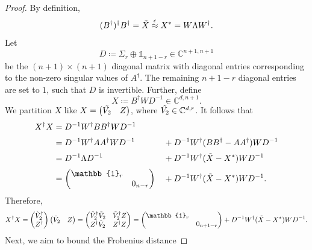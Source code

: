 \begin{proof}
By definition,
\begin{equation*}
(B^{\dag})^{\dag}B^{\dag}=\Tilde{X}\stackrel{\epsilon}{\approx}X^*=W\Lambda W^{\dag}.
\end{equation*}
Let 
\begin{equation*}
D\coloneqq\Sigma_r\oplus\mathbb{1}_{n+1-r}\in\mathbb{C}^{n+1,n+1}
\end{equation*} be the $(n+1)\times (n+1)$ diagonal matrix with diagonal entries corresponding to the non-zero singular values of $A^{\dag}$. The remaining $n+1-r$ diagonal entries are set to $1$, such that $D$ is invertible. Further, define
\begin{equation*}
X\coloneqq B^{\dag} W D^{-1}\in\mathbb{C}^{d,n+1}.
\end{equation*}
We partition $X$ like $X=
\begin{pmatrix}
\Tilde{V_2} &  Z
\end{pmatrix}$, where $\Tilde{V_2}\in\mathbb{C}^{d,r}$.
It follows that
\begin{alignat*}{2}
X^{\dag}X & = D^{-1}W^{\dag}BB^{\dag}WD^{-1} && \\[0.2em]
& = D^{-1}W^{\dag}AA^{\dag}WD^{-1} && +D^{-1}W^{\dag}(BB^{\dag}-AA^{\dag})WD^{-1} \\[0.2em]
& = D^{-1}\Lambda D^{-1} && + D^{-1}W^{\dag}(\Tilde{X}-X^*)WD^{-1} \\[0.2em]
& =
\begin{pmatrix}
\mathbb{1}_r & \\
& 0_{n-r}
\end{pmatrix} && + D^{-1}W^{\dag}(\Tilde{X}-X^*)WD^{-1}.
\end{alignat*}
Therefore,
\begin{equation*}
X^{\dag}X=
\begin{pmatrix}
\Tilde{V}_2^{\dag}\\
Z^{\dag}
\end{pmatrix}
\begin{pmatrix}
\Tilde{V}_2 & Z
\end{pmatrix} =
\begin{pmatrix}
\Tilde{V}_2^{\dag}\Tilde{V}_2 & \Tilde{V}_2^{\dag} Z \\
Z^{\dag}\Tilde{V}_2 & Z^{\dag}Z
\end{pmatrix}
= 
\begin{pmatrix}
\mathbb{1}_r & \\
& 0_{n+1-r}
\end{pmatrix} + D^{-1}W^{\dag}(\Tilde{X}-X^*)WD^{-1}.
\end{equation*}
Next, we aim to bound the Frobenius distance

\end{proof}
